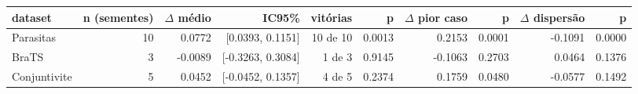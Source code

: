 \begin{tabular}{lrrrrrrrrr}
\hline
dataset & n (sementes) & $\Delta$ médio & IC95\% & vitórias & p & $\Delta$ pior caso & p  & $\Delta$ dispersão & p   \\
\hline
Parasitas & 10 & 0.0772 & [0.0393, 0.1151] & 10 de 10 & 0.0013 & 0.2153 & 0.0001 & -0.1091 & 0.0000 \\
BraTS & 3 & -0.0089 & [-0.3263, 0.3084] & 1 de 3 & 0.9145 & -0.1063 & 0.2703 & 0.0464 & 0.1376 \\
Conjuntivite & 5 & 0.0452 & [-0.0452, 0.1357] & 4 de 5 & 0.2374 & 0.1759 & 0.0480 & -0.0577 & 0.1492 \\
\hline
\end{tabular}
